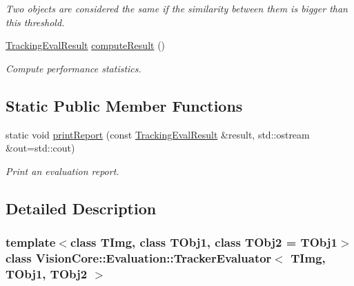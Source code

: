 \begin{DoxyCompactItemize}
\begin{DoxyCompactList}\small\item\em Two objects are considered the same if the similarity between them is bigger than this threshold. \end{DoxyCompactList}\item 
\hypertarget{class_vision_core_1_1_evaluation_1_1_tracker_evaluator_a806aa368bb6cb66f3bc990c145456cd2}{}\hyperlink{struct_vision_core_1_1_evaluation_1_1_tracking_eval_result}{Tracking\+Eval\+Result} \hyperlink{class_vision_core_1_1_evaluation_1_1_tracker_evaluator_a806aa368bb6cb66f3bc990c145456cd2}{compute\+Result} ()\label{class_vision_core_1_1_evaluation_1_1_tracker_evaluator_a806aa368bb6cb66f3bc990c145456cd2}

\begin{DoxyCompactList}\small\item\em Compute performance statistics. \end{DoxyCompactList}\end{DoxyCompactItemize}
\subsection*{Static Public Member Functions}
\begin{DoxyCompactItemize}
\item 
\hypertarget{class_vision_core_1_1_evaluation_1_1_tracker_evaluator_ac26805d769b890cf93ad468ff49c370c}{}static void \hyperlink{class_vision_core_1_1_evaluation_1_1_tracker_evaluator_ac26805d769b890cf93ad468ff49c370c}{print\+Report} (const \hyperlink{struct_vision_core_1_1_evaluation_1_1_tracking_eval_result}{Tracking\+Eval\+Result} \&result, std\+::ostream \&out=std\+::cout)\label{class_vision_core_1_1_evaluation_1_1_tracker_evaluator_ac26805d769b890cf93ad468ff49c370c}

\begin{DoxyCompactList}\small\item\em Print an evaluation report. \end{DoxyCompactList}\end{DoxyCompactItemize}


\subsection{Detailed Description}
\subsubsection*{template$<$class T\+Img, class T\+Obj1, class T\+Obj2 = T\+Obj1$>$class Vision\+Core\+::\+Evaluation\+::\+Tracker\+Evaluator$<$ T\+Img, T\+Obj1, T\+Obj2 $>$}

